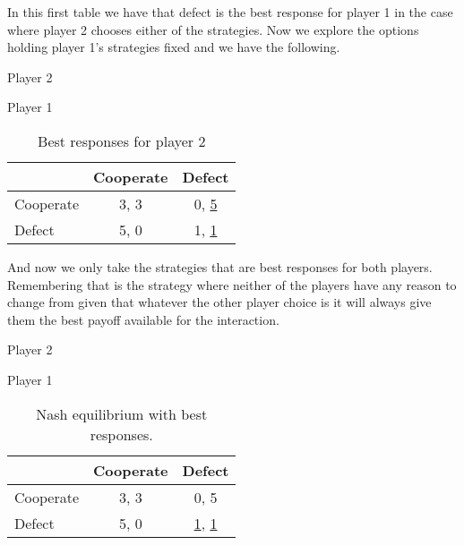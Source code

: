 In this first table we have that defect is the best response for player 1 in the case where player 2 chooses either of the strategies. 
Now we explore the options holding player 1's strategies fixed and we have the following.

\begin{table}[h]
\begin{center}
Player 2

Player 1
\begin{tabular}{|l|c|c|}
\hline
 & Cooperate & Defect\\ 
\hline
Cooperate & 3, 3 & 0, \underline{5}\\
\hline
Defect & 5, 0 & 1, \underline{1}\\
\hline
\end{tabular}
\caption{ Best responses for player 2}
\label{tab:normformbr2}
\end{center}
\end{table}

And now we only take the strategies that are best responses for both players. Remembering that is the strategy where neither of the players have any reason to change from given that whatever the other player choice is it will always give them the best payoff available for the interaction.
 \begin{table}[h]
\begin{center}
Player 2

Player 1
\begin{tabular}{|l|c|c|}
\hline
 & Cooperate & Defect\\ 
\hline
Cooperate & 3, 3 & 0, 5\\
\hline
Defect & 5, 0 & \underline{1}, \underline{1}\\
\hline
\end{tabular}
\caption{ Nash equilibrium with best responses.}
\label{tab:normformbr3}
\end{center}
\end{table}

